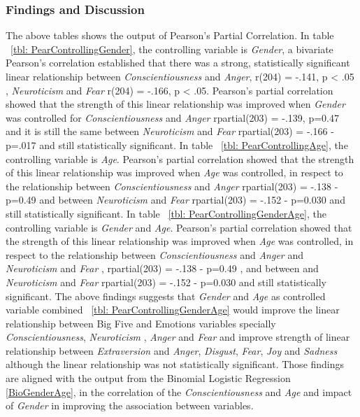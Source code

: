 \documentclass{llncs}
\begin{document}
\subsubsection{Findings and Discussion}

The above tables shows the output of Pearson's Partial Correlation. In table ~\ref{tbl: PearControllingGender}, the controlling variable is \emph{Gender}, a bivariate Pearson's correlation established that there was a strong, statistically significant linear relationship between \emph{Conscientiousness} and \emph{Anger}, r(204) = -.141, p < .05 , \emph{Neuroticism} and \emph{Fear} r(204) = -.166, p < .05. Pearson's partial correlation showed that the strength of this linear relationship was improved when \emph{Gender} was controlled for  \emph{Conscientiousness} and \emph{Anger} rpartial(203) = -.139, p=0.47 and it is still the same between \emph{Neuroticism} and \emph{Fear}  rpartial(203) = -.166 - p=.017 and still statistically significant. In table ~\ref{tbl: PearControllingAge}, the controlling variable is \emph{Age}. Pearson's partial correlation showed that the strength of this linear relationship was improved when \emph{Age} was controlled, in respect to the relationship between \emph{Conscientiousness} and \emph{Anger}  rpartial(203) = -.138 - p=0.49 and between \emph{Neuroticism} and \emph{Fear} rpartial(203) = -.152 - p=0.030  and still statistically significant. In table ~\ref{tbl: PearControllingGenderAge}, the controlling variable is \emph{Gender} and \emph{Age}. Pearson's partial correlation showed that the strength of this linear relationship was improved when \emph{Age} was controlled, in respect to the relationship between \emph{Conscientiousness} and \emph{Anger} and \emph{Neuroticism} and \emph{Fear} , rpartial(203) = -.138 - p=0.49 , and between and \emph{Neuroticism} and \emph{Fear} rpartial(203) = -.152 - p=0.030  and still statistically significant. The above findings suggests that \emph{Gender} and \emph{Age} as controlled variable combined ~\ref{tbl: PearControllingGenderAge} would improve the linear relationship between Big Five and Emotions variables specially \emph{Conscientiousness}, \emph{Neuroticism} , \emph{Anger} and \emph{Fear} and improve strength of linear relationship between \emph{Extraversion} and \emph{Anger}, \emph{Disgust}, \emph{Fear}, \emph{Joy} and \emph{Sadness} although the linear relationship was not statistically significant. Those findings are aligned with the output from the Binomial Logistic Regression \ref{BioGenderAge}, in the correlation of the \emph{Conscientiousness} and \emph{Age} and impact of \emph{Gender} in improving the association between variables.




\end{document}
